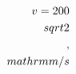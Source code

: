 \documentclass[preview]{standalone}
\begin{document}
\begin{align*}
\special{dvisvgm:raw <g id='unique000'>}v = 200\\sqrt{2}\\,\\mathrm{m/s}\special{dvisvgm:raw </g>}
\end{align*}
\end{document}
